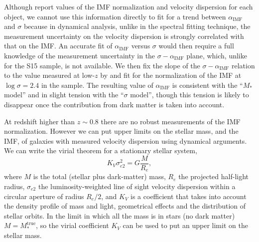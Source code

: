 \documentclass[usenatbib]{mnras}
\def\mtrue{M_*^{\mathrm{true}}}
\def\aimf{\alpha_{\mathrm{IMF}}}
\begin{document}
Although \citet{S+C14} report values of the IMF normalization and
velocity dispersion for each object, we cannot use this information
directly to fit for a trend between $\aimf$ and $\sigma$ because in
dynamical analysis, unlike in the spectral fitting technique, the
measurement uncertainty on the velocity dispersion is strongly
correlated with that on the IMF.  An accurate fit of
$\aimf$ versus $\sigma$ would then require a full knowledge of the
measurement uncertainty in the $\sigma-\aimf$ plane, which, unlike for the S15 sample, is not
available.  We then fix the slope of the $\sigma-\aimf$ relation to
the value measured at low-$z$ by \citet{Spi++14} and fit for the
normalization of the IMF at $\log{\sigma}=2.4$ in the \citet{S+C14}
sample.  The resulting value of $\aimf$ is consistent with the ``$M_*$
model'' and in slight tension with the ``$\sigma$ model'', though this
tension is likely to disappear once the contribution from dark matter
is taken into account.


At redshift higher than $z\sim0.8$ there are no robust measurements of
the IMF normalization.  However we can put upper limits on the stellar
mass, and the IMF, of galaxies with measured velocity dispersion using
dynamical arguments.  We can write the virial theorem for a stationary
stellar system,
\begin{equation}\label{eq:virial}
K_V\sigma_{e2}^2 = G\frac{M}{R_e},
\end{equation}
where $M$ is the total (stellar plus dark-matter) mass, $R_e$ the
projected half-light radius, $\sigma_{e2}$ the luminosity-weighted
line of sight velocity dispersion within a circular aperture of radius
$R_e/2$, and $K_V$ is a coefficient that takes into account the
density profile of mass and light, geometrical effects and the
distribution of stellar orbits.  In the limit in which all the
  mass is in stars (no dark matter) $M=\mtrue$, so the virial
  coefficient $K_V$ can be used to put an upper limit on the stellar
  mass.
\end{document}
